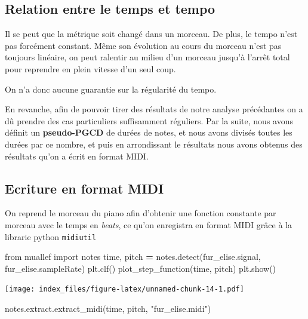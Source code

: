 \documentclass[french,]{article}
\newenvironment{Shaded}{\begin{snugshade}}{\end{snugshade}}
\newcommand{\ImportTok}[1]{#1}
\newcommand{\NormalTok}[1]{#1}
\newcommand{\OperatorTok}[1]{\textcolor[rgb]{0.81,0.36,0.00}{\textbf{#1}}}
\newcommand{\StringTok}[1]{\textcolor[rgb]{0.31,0.60,0.02}{#1}}
\begin{document}
\hypertarget{relation-entre-le-temps-et-tempo}{%
\subsection{Relation entre le temps et
tempo}\label{relation-entre-le-temps-et-tempo}}

Il se peut que la métrique soit changé dans un morceau. De plus, le
tempo n'est pas forcément constant. Même son évolution au cours du
morceau n'est pas toujours linéaire, on peut ralentir au milieu d'un
morceau jusqu'à l'arrêt total pour reprendre en plein vitesse d'un seul
coup.

On n'a donc aucune guarantie sur la régularité du tempo.

En revanche, afin de pouvoir tirer des résultats de notre analyse
précédantes on a dû prendre des cas particuliers suffisamment réguliers.
Par la suite, nous avons définit un \textbf{pseudo-PGCD} de durées de
notes, et nous avons divisés toutes les durées par ce nombre, et puis en
arrondissant le résultats nous avons obtenus des résultats qu'on a écrit
en format MIDI.

\hypertarget{ecriture-en-format-midi}{%
\subsection{Ecriture en format MIDI}\label{ecriture-en-format-midi}}

On reprend le morceau du piano afin d'obtenir une fonction constante par
morceau avec le temps en \emph{beats}, ce qu'on enregistra en format
MIDI grâce à la librarie python \texttt{midiutil}

\begin{Shaded}
\begin{Highlighting}[]
\ImportTok{from}\NormalTok{ muallef }\ImportTok{import}\NormalTok{ notes}
\NormalTok{time, pitch }\OperatorTok{=}\NormalTok{ notes.detect(fur_elise.signal, fur_elise.sampleRate)}
\NormalTok{plt.clf()}
\NormalTok{plot_step_function(time, pitch)}
\NormalTok{plt.show()}
\end{Highlighting}
\end{Shaded}

\texttt{[image: index\_files/figure-latex/unnamed-chunk-14-1.pdf]}

\begin{Shaded}
\begin{Highlighting}[]
\NormalTok{notes.extract.extract_midi(time, pitch, }\StringTok{"fur_elise.midi"}\NormalTok{)}
\end{Highlighting}
\end{Shaded}
\end{document}
